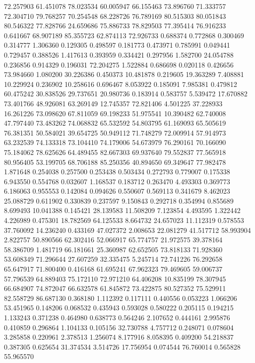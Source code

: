 72.257903
61.451078
78.023534
60.005947
66.155463
73.896760
71.333757
72.304710
79.768257
70.254548
68.228726
76.789169
80.515303
80.051843
80.546322
77.828766
24.659686
75.886733
78.829503
77.395414
76.916233
0.641667
68.907189
85.355723
62.874113
72.926733
0.688374
0.772868
0.300469
0.314777
1.306360
0.129305
0.498597
0.181773
0.473971
0.785991
0.049441
0.729457
0.388526
1.417613
0.393959
0.334421
0.297956
1.582700
24.054788
0.236856
0.914329
0.196031
72.204275
1.522884
0.686698
0.020118
0.426656
73.984660
1.080200
30.226386
0.450373
10.481878
0.219605
19.363289
7.408881
10.229924
0.236902
10.258616
0.696467
8.053922
0.185091
7.985381
0.479812
60.475242
30.838526
29.737651
20.980736
0.183914
0.583757
5.539472
17.670882
73.401766
48.926081
63.269149
12.745357
72.821406
4.501225
37.228933
16.261226
73.098620
67.811059
69.198233
51.975541
10.390482
62.740008
47.797440
73.483262
74.068832
65.532592
54.803795
61.169093
65.505619
76.381351
50.584021
39.654725
50.949112
71.748279
72.009914
57.914973
63.232539
74.133318
73.104410
74.179006
54.673979
76.290161
70.166090
75.184062
78.625626
64.489455
82.667303
69.937640
79.552837
77.565918
80.956405
53.199705
68.706188
85.250356
40.894650
69.349647
77.982478
1.871648
0.254038
0.257500
0.253438
0.503434
0.272793
0.779007
0.175338
6.943550
0.554768
0.032607
1.168537
0.183712
0.263470
4.493303
0.369773
6.186063
0.955553
0.142084
0.094626
0.550607
0.569113
0.341679
8.462023
25.088729
0.611902
0.330839
0.237597
9.150843
0.292718
0.354994
0.855689
8.699493
10.041388
0.145421
28.139583
11.508209
7.123854
4.493595
1.322442
4.226989
0.475301
18.782569
64.125533
8.664732
24.657023
11.112319
0.578553
37.760092
14.236240
0.433169
47.027372
2.008653
22.081279
41.517712
58.993904
2.822757
50.890566
62.302416
52.066917
65.774757
21.972575
39.378164
58.386709
1.481719
66.181661
25.360987
62.652505
73.818133
71.928360
53.608349
71.296644
27.607259
32.335475
5.245714
72.741226
76.292658
65.647917
71.800400
0.416168
61.695241
67.962323
79.469605
59.006737
57.796539
64.889403
75.172110
72.971210
64.406208
10.835199
78.307945
66.684907
74.872047
66.632578
61.845872
73.422875
80.527352
75.529911
82.558729
86.687130
0.368180
1.112392
0.117111
0.440556
0.053223
1.066206
53.451965
0.148206
0.068532
0.435943
0.593028
0.580222
0.205115
0.194215
1.133243
0.371238
0.464980
0.638773
0.564246
2.107652
0.444161
2.995876
0.410859
0.296864
1.104133
0.105156
32.730788
4.757712
0.248071
0.078604
3.285858
0.220961
2.378513
1.256074
8.177916
8.058395
0.409200
54.218837
0.387305
0.625654
31.374534
3.514726
17.756954
0.074544
76.760014
0.565828
55.965570
